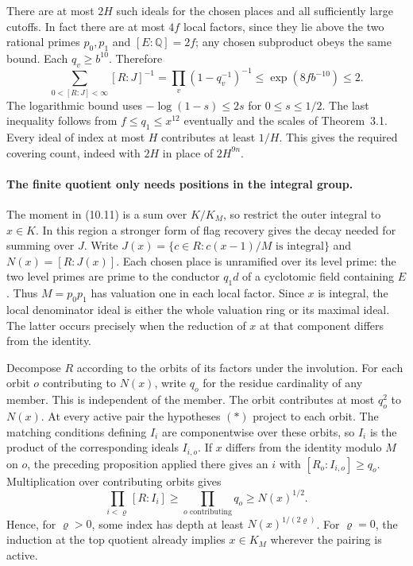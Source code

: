 There are at most $2H$ such ideals for the chosen places and all
sufficiently large cutoffs. In fact there are at most $4f$ local
factors, since they lie above the two rational primes $p_0,p_1$
and $[E:\mathbb Q]=2f$; any chosen subproduct obeys the same bound.
Each $q_v\ge b^{10}$. Therefore
\[
 \sum_{0<[R:J]<\infty}[R:J]^{-1}
   =\prod_v(1-q_v^{-1})^{-1}
   \le \exp(8f b^{-10})\le 2.
\]
The logarithmic bound uses $-\log(1-s)\le2s$ for $0\le s\le 1/2$.
The last inequality follows from $f\le q_1\le x^{12}$ eventually
and the scales of Theorem~3.1. Every ideal of index at most $H$
contributes at least $1/H$. This gives the required covering count,
indeed with $2H$ in place of $2H^{9n}$.

\paragraph{The finite quotient only needs positions in the integral group.}
The moment in (10.11) is a sum over $K/K_M$, so restrict the outer
integral to $x\in K$. In this region a stronger form of flag recovery
gives the decay needed for summing over $J$. Write
$J(x)=\{c\in R:c(x-1)/M\text{ is integral}\}$ and
$N(x)=[R:J(x)]$. Each chosen place is unramified over its level
prime: the two level primes are prime to the conductor $q_1d$ of a
cyclotomic field containing $E$. Thus $M=p_0p_1$ has valuation one
in each local factor. Since $x$ is integral, the local denominator
ideal is either the whole valuation ring or its maximal ideal. The
latter occurs precisely when the reduction of $x$ at that component
differs from the identity.

Decompose $R$ according to the orbits of its factors under the
involution. For each orbit $o$ contributing to $N(x)$, write $q_o$
for the residue cardinality of any member. This is independent of the
member. The orbit contributes at most $q_o^2$ to $N(x)$.
At every active pair the hypotheses $(*)$ project to each orbit.
The matching conditions defining $I_i$ are componentwise over these
orbits, so $I_i$ is the product of the corresponding ideals $I_{i,o}$.
If $x$ differs from the identity modulo $M$ on $o$, the preceding
proposition applied there gives an $i$ with
$[R_o:I_{i,o}]\ge q_o$. Multiplication over contributing orbits gives
\[
  \prod_{i<\varrho}[R:I_i]\ge\prod_{o\text{ contributing}}q_o
       \ge N(x)^{1/2}.
\]
Hence, for $\varrho>0$, some index has depth at least
$N(x)^{1/(2\varrho)}$. For $\varrho=0$, the induction at the top
quotient already implies $x\in K_M$ wherever the pairing is active.


